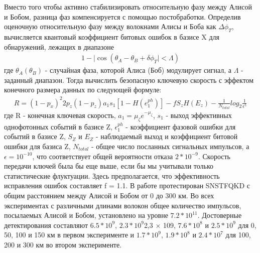  Вместо того чтобы активно стабилизировать относительную фазу между Алисой и Бобом, разница фаз компенсируется с помощью постобработки. Определив оценочную относительную фазу между волокнами Алисы и Боба как $\Delta\phi_T$, вычисляется квантовый коэффициент битовых ошибок в базисе X для обнаружений, лежащих в диапазоне 
 \begin{align}
    1 - |\cos(\theta_A - \theta_B + \delta\phi_T| < \Lambda)
\end{align}\label{eq: QBER error TF}
 где $\theta_A (\theta_B)$ - случайная фаза, которой Алиса (Боб) модулирует сигнал, а $\Lambda$ - заданный диапазон. Тогда вычислить безопасную ключевую скорость с эффектом конечного размера данных по следующей формуле:
 \begin{align}
    R = (1 - p_x)^2{2p_z(1-p_z)a_1s_1[1 - H(e_1^{ph})] - fS_zH(E_z)} - \frac{1}{N_{total}}log_2\frac{1}{\epsilon^5}
\end{align}\label{eq: TF qkd rate lit}
 где R - конечная ключевая скорость, $a_1 = \mu_{\zeta}e^{-\mu_{\zeta}}$, $s_1$ - выход эффективных однофотонных событий в базисе Z, $\epsilon_1^{ph}$ - коэффициент фазовой ошибки для событий в базисе Z, $S_Z$ и $E_Z$ - наблюдаемый выход и коэффициент битовой ошибки для базиса Z, $N_{total}$ - общее число посланных сигнальных импульсов, а $\epsilon =10^{-10}$, что соответствует общей вероятности отказа $2*10^{-9}$. Скорость передачи ключей была бы еще выше, если бы мы учитывали только статистические флуктуации. Здесь предполагается, что эффективность исправления ошибок составляет f = 1.1. В работе протестирован SNSTFQKD с общим расстоянием между Алисой и Бобом от 0 до 300 км.  Во всех экспериментах с различными длинами волокон общее количество импульсов, посылаемых Алисой и Бобом, установлено на уровне $7.2*10^{11}$. Достоверные детектирования составляют $6.5*10^{9}$, $2.3*10^{9}$2,3 × 109, $7.6*10^{8}$ и $2.5*10^{9}$ для 0, 50, 100 и 150 км в первом эксперименте и $1.7*10^{9}$, $1.9*10^{8}$  и  $2.4*10^{7}$ для 100, 200 и 300 км во втором эксперименте. 
